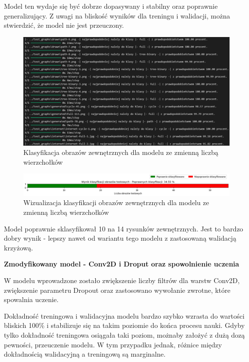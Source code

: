 Model ten wydaje się być dobrze dopasywany i stabilny oraz poprawnie generalizujący.
Z uwagi na bliskość wyników dla treningu i walidacji, można stwierdzić, że model nie jest przeuczony.

\begin{figure}[ht]
	\centering
	\includegraphics[width=14cm]{resources/tests/images/v3/multiple_edges_txt.png}
	\caption{Klasyfikacja obrazów zewnętrznych dla modelu ze zmienną liczbą wierzchołków}
	\label{Fig:tests-var-0b}
\end{figure}
\FloatBarrier

\begin{figure}[ht]
	\centering
	\includegraphics[width=14cm]{resources/tests/images/v3/multiple_edges_bar.png}
	\caption{Wizualizacja klasyfikacji obrazów zewnętrznych dla modelu ze zmienną liczbą wierzchołków}
	\label{Fig:tests-var-0c}
\end{figure}
\FloatBarrier

Model poprawnie sklasyfikował 10 na 14 rysunków zewnętrznych.
Jest to bardzo dobry wynik - lepszy nawet od wariantu tego modelu z zastosowaną walidacją krzyżową.

\textbf{Zmodyfikowany model - Conv2D i Droput oraz spowolnienie uczenia}

W modelu wprowadzone zostało zwiększenie liczby filtrów dla warstw Conv2D, zwiększenie parametru Dropout
oraz zastosowano wywołanie zwrotne, które spowalnia uczenie.

Dokładność treningowa i walidacyjna modelu bardzo szybko wzrasta do wartości bliskich 100\%
i stabilizuje się na takim poziomie do końca procesu nauki.
Gdyby tylko dokładność treningowa osiągała taki poziom, możnaby założyć z dużą dozą pewności, przeuczenie modelu.
W tym przypadku jednak, różnice między dokładnością walidacyjną a treningową są marginalne.

